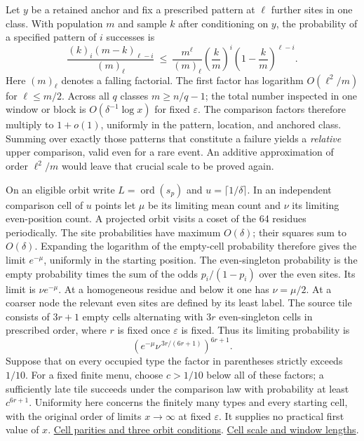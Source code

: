 \documentclass[12pt,letterpaper]{article}
\begin{document}
Let \(y\) be a retained anchor and fix a prescribed pattern at \(\ell\) further sites in one class. With population \(m\) and sample \(k\) after conditioning on \(y\), the probability of a specified pattern of \(i\) successes is
\[
 \frac{(k)_i(m-k)_{\ell-i}}{(m)_\ell}
 \ \le\ \frac{m^\ell}{(m)_\ell}
       \left(\frac{k}{m}\right)^i
       \left(1-\frac{k}{m}\right)^{\ell-i}.
\]
Here \((m)_\ell\) denotes a falling factorial. The first factor has logarithm \(O(\ell^2/m)\) for \(\ell\le m/2\). Across all \(q\) classes \(m\ge n/q-1\); the total number inspected in one window or block is \(O(\delta^{-1}\log x)\) for fixed \(\varepsilon\). The comparison factors therefore multiply to \(1+o(1)\), uniformly in the pattern, location, and anchored class. Summing over exactly those patterns that constitute a failure yields a \emph{relative} upper comparison, valid even for a rare event. An additive approximation of order \(\ell^2/m\) would leave that crucial scale to be proved again.

On an eligible orbit write \(L=\operatorname{ord}(s_p)\) and \(u=\lceil1/\delta\rceil\). In an independent comparison cell of \(u\) points let \(\mu\) be its limiting mean count and \(\nu\) its limiting even-position count. A projected orbit visits a coset of the 64 residues periodically. The site probabilities have maximum \(O(\delta)\); their squares sum to \(O(\delta)\). Expanding the logarithm of the empty-cell probability therefore gives the limit \(e^{-\mu}\), uniformly in the starting position. The even-singleton probability is the empty probability times the sum of the odds \(p_i/(1-p_i)\) over the even sites. Its limit is \(\nu e^{-\mu}\). At a homogeneous residue and below it one has \(\nu=\mu/2\). At a coarser node the relevant even sites are defined by its least label. The source tile consists of \(3r+1\) empty cells alternating with \(3r\) even-singleton cells in prescribed order, where \(r\) is fixed once \(\varepsilon\) is fixed. Thus its limiting probability is
\[
 \left(e^{-\mu}\nu^{\,3r/(6r+1)}\right)^{6r+1}.
\]
Suppose that on every occupied type the factor in parentheses strictly exceeds \(1/10\). For a fixed finite menu, choose \(c>1/10\) below all of these factors; a sufficiently late tile succeeds under the comparison law with probability at least \(c^{6r+1}\). Uniformity here concerns the finitely many types and every starting cell, with the original order of limits \(x\to\infty\) at fixed \(\varepsilon\). It supplies no practical first value of \(x\).
\href{https://github.com/nousentllc/riemann-hypothesis/blob/40e56bab026552e089d7afcfeff08d2defb9c005/src/Formalism/SubspaceCounting/GoodOrbitIntervalTileCondition.lean#L9-L26}{Cell parities and three orbit conditions}.
\href{https://github.com/nousentllc/riemann-hypothesis/blob/40e56bab026552e089d7afcfeff08d2defb9c005/src/Formalism/SharpRestriction/GrowthBounds/UnramifiedQuadraticSetting.lean#L237-L251}{Cell scale and window lengths}.
\end{document}
